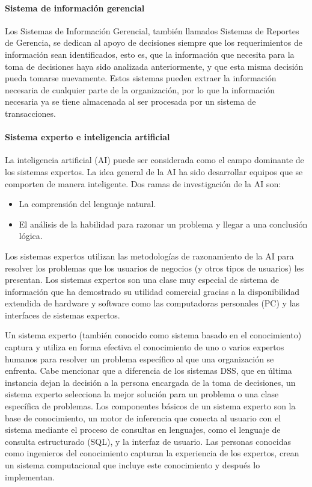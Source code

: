 \paragraph{Sistema de información gerencial}

Los Sistemas de Información Gerencial, también llamados Sistemas de Reportes de Gerencia, se dedican al apoyo de decisiones siempre que los requerimientos de información sean identificados, esto es, que la información que necesita para la toma de decisiones haya sido analizada anteriormente, y que esta misma decisión pueda tomarse nuevamente\cite{kendall2005analisis}. Estos sistemas pueden extraer la información necesaria de cualquier parte de la organización, por lo que la información necesaria ya se tiene almacenada al ser procesada por un sistema de transacciones. 


\paragraph{Sistema experto e inteligencia artificial }

La inteligencia artificial (AI) puede ser considerada como el campo dominante de los sistemas expertos. La idea general de la AI ha sido desarrollar equipos que se comporten de manera inteligente\cite{kendall2005analisis}. Dos ramas de investigación de la AI son: 

\begin{itemize}

\item La comprensión del lenguaje natural. 
\item El análisis de la habilidad para razonar un problema y llegar a una conclusión lógica. 

\end{itemize}

Los sistemas expertos utilizan las metodologías de razonamiento de la AI para resolver los problemas que los usuarios de negocios (y otros tipos de usuarios) les presentan. Los sistemas expertos son una clase muy especial de sistema de información que ha demostrado su utilidad comercial gracias a la disponibilidad extendida de hardware y software como las computadoras personales (PC) y las interfaces de sistemas expertos.


Un sistema experto (también conocido como sistema basado en el conocimiento) captura y utiliza en forma efectiva el conocimiento de uno o varios expertos humanos para resolver un problema específico al que una organización se enfrenta. Cabe mencionar que a diferencia de los sistemas DSS, que en última instancia dejan la decisión a la persona encargada de la toma de decisiones, un sistema experto selecciona la mejor solución para un problema o una clase específica de problemas. Los componentes básicos de un sistema experto son la base de conocimiento, un motor de inferencia que conecta al usuario con el sistema mediante el proceso de consultas en lenguajes, como el lenguaje de consulta estructurado (SQL), y la interfaz de usuario. Las personas conocidas como ingenieros del conocimiento capturan la experiencia de los expertos, crean un sistema computacional que incluye este conocimiento y después lo implementan\cite{kendall2005analisis}.



